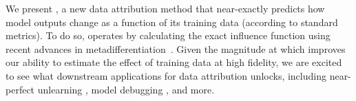 We present \method{}, a new data attribution method that near-exactly predicts
how model outputs change as a function of its training data (according to
standard metrics). To do so, \method{} operates by calculating the
exact influence function using recent advances in
metadifferentiation~\citep{engstrom2025optimizing}. Given the magnitude at which
\method{} improves our ability to estimate the effect of training data at high
fidelity, we are excited to see what downstream applications  for data
attribution \method{} unlocks, including near-perfect unlearning
\citep{georgiev2024attribute}, model debugging
\citep{koh2017understanding,shah2022modeldiff}, and more.
